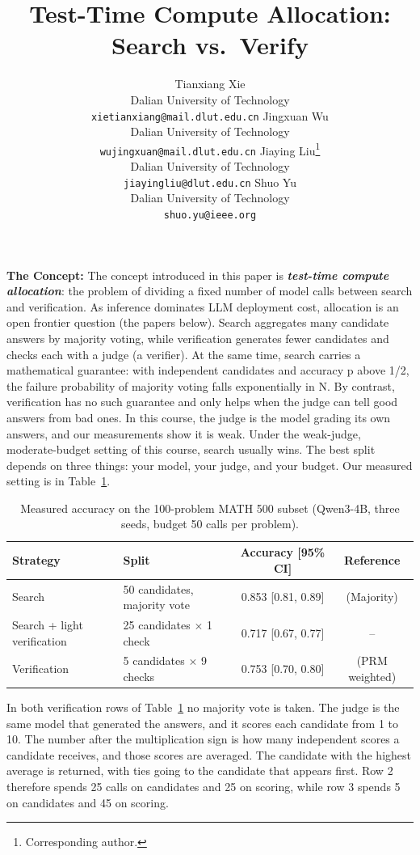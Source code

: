\documentclass{article}
\title{Test-Time Compute Allocation: Search vs.\ Verify}
\author{%
  Tianxiang Xie \\
  Dalian University of Technology \\
  \texttt{xietianxiang@mail.dlut.edu.cn} \And
  Jingxuan Wu \\
  Dalian University of Technology \\
  \texttt{wujingxuan@mail.dlut.edu.cn} \And
  Jiaying Liu\thanks{Corresponding author.} \\
  Dalian University of Technology \\
  \texttt{jiayingliu@dlut.edu.cn} \And
  Shuo Yu \\
  Dalian University of Technology \\
  \texttt{shuo.yu@ieee.org}%
}
\newcommand{\blk}[1]{\vspace{1pt}\noindent\textbf{\normalsize #1}\hspace{0.5em}\ignorespaces}
\begin{document}
\maketitle

\blk{The Concept:}
The concept introduced in this paper is \textbf{\textit{test-time compute allocation}}: the problem of dividing a fixed number of model calls between search and verification. As inference dominates LLM deployment cost, allocation is an open frontier question (the papers below). Search aggregates many candidate answers by majority voting, while verification generates fewer candidates and checks each with a judge (a verifier). At the same time, search carries a mathematical guarantee: with independent candidates and accuracy p above 1/2, the failure probability of majority voting falls exponentially in N. By contrast, verification has no such guarantee and only helps when the judge can tell good answers from bad ones. In this course, the judge is the model grading its own answers, and our measurements show it is weak. Under the weak-judge, moderate-budget setting of this course, search usually wins. The best split depends on three things: your model, your judge, and your budget. Our measured setting is in Table~\ref{tab:worked}.

\begin{table}[h!]
  \caption{Measured accuracy on the 100-problem MATH 500 subset (Qwen3-4B, three seeds, budget 50 calls per problem).}
  \label{tab:worked}
  \centering
  \small
  \setlength{\tabcolsep}{3pt}
  \begin{tabular}{llcc}
    \toprule
    Strategy & Split & Accuracy [95\% CI] & Reference \\
    \midrule
    Search & 50 candidates, majority vote & 0.853 [0.81, 0.89] & \citep{iclr2025scaling} (Majority) \\
    Search + light verification & 25 candidates $\times$ 1 check & 0.717 [0.67, 0.77] & -- \\
    Verification & 5 candidates $\times$ 9 checks & 0.753 [0.70, 0.80] & \citep{iclr2025scaling} (PRM weighted) \\
    \bottomrule
  \end{tabular}
\end{table}

In both verification rows of Table~\ref{tab:worked} no majority vote is taken. The judge is the same model that generated the answers, and it scores each candidate from 1 to 10. The number after the multiplication sign is how many independent scores a candidate receives, and those scores are averaged. The candidate with the highest average is returned, with ties going to the candidate that appears first. Row 2 therefore spends 25 calls on candidates and 25 on scoring, while row 3 spends 5 on candidates and 45 on scoring.
\end{document}
